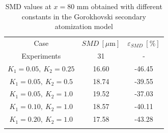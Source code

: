 \begin{table}[!h]
\centering
\caption{SMD values at $x = 80$ mm obtained with different constants in the Gorokhovski secondary atomization model}
\begin{tabular}{ccc}
\thickhline
Case & $SMD~\left[\mu \mathrm{m} \right]$ & $\varepsilon_{SMD}~\left[\% \right]$ \\
\thickhline
Experiments & 31 & - \\
$K_1 = 0.05,~K_2 = 0.25$ & 16.60 & -46.45 \\
$K_1 = 0.05,~K_2 = 0.5$ & 18.74 & -39.55 \\
$K_1 = 0.05,~K_2 = 1.0$ & 19.52 & -37.03 \\
$K_1 = 0.10,~K_2 = 1.0$ & 18.57 & -40.11 \\
$K_1 = 0.20,~K_2 = 1.0$ & 17.58 & -43.28 \\
\thickhline
\end{tabular}
\label{tab:SMD_deviations_turb_inj}
\end{table}


\clearpage


